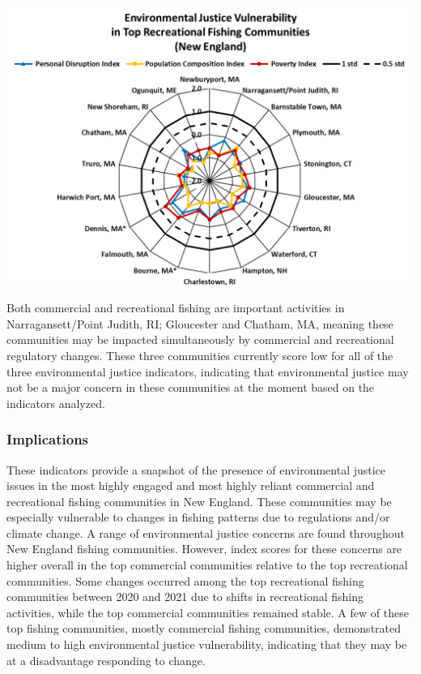 \documentclass[
  10pt,
]{article}
\let\origfigure\figure
\let\endorigfigure\endfigure
\renewenvironment{figure}[1][2] {
    \expandafter\origfigure\expandafter[H]
} {
    \endorigfigure
}
\begin{document}
\begin{figure}

{\centering \includegraphics[width=0.75\linewidth]{SOE-NEFMC_files/figure-latex/recreational-EJ-1} 

}

\caption{Environmental justice indicators (Poverty Index, population composition index, and personal disruption index) for top recreational fishing communities in New England. *Community scored high (1.00 and above) for both commercial engagement and reliance indicators.}\label{fig:recreational-EJ}
\end{figure}
\newpage

Both commercial and recreational fishing are important activities in Narragansett/Point Judith, RI; Gloucester and Chatham, MA, meaning these communities may be impacted simultaneously by commercial and recreational regulatory changes. These three communities currently score low for all of the three environmental justice indicators, indicating that environmental justice may not be a major concern in these communities at the moment based on the indicators analyzed.

\hypertarget{implications-4}{%
\subsubsection{Implications}\label{implications-4}}

These indicators provide a snapshot of the presence of environmental justice issues in the most highly engaged and most highly reliant commercial and recreational fishing communities in New England. These communities may be especially vulnerable to changes in fishing patterns due to regulations and/or climate change. A range of environmental justice concerns are found throughout New England fishing communities. However, index scores for these concerns are higher overall in the top commercial communities relative to the top recreational communities. Some changes occurred among the top recreational fishing communities between 2020 and 2021 due to shifts in recreational fishing activities, while the top commercial communities remained stable. A few of these top fishing communities, mostly commercial fishing communities, demonstrated medium to high environmental justice vulnerability, indicating that they may be at a disadvantage responding to change.
\end{document}
